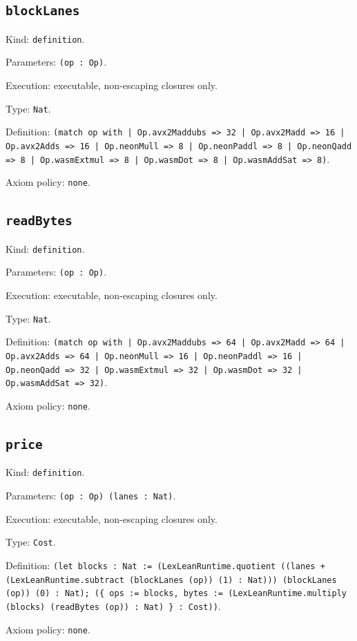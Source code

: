 \documentclass[11pt]{article}
\begin{document}
\subsection*{\texttt{blockLanes}}
\noindent Kind: \texttt{definition}.\par
\noindent Parameters: \texttt{(op : Op)}.\par
\noindent Execution: executable, non-escaping closures only.\par
\noindent Type: \texttt{Nat}.\par
\noindent Definition: \texttt{(match op with | Op.avx2Maddubs => 32 | Op.avx2Madd => 16 | Op.avx2Adds => 16 | Op.neonMull => 8 | Op.neonPaddl => 8 | Op.neonQadd => 8 | Op.wasmExtmul => 8 | Op.wasmDot => 8 | Op.wasmAddSat => 8)}.\par
\noindent Axiom policy: \texttt{none}.\par
\subsection*{\texttt{readBytes}}
\noindent Kind: \texttt{definition}.\par
\noindent Parameters: \texttt{(op : Op)}.\par
\noindent Execution: executable, non-escaping closures only.\par
\noindent Type: \texttt{Nat}.\par
\noindent Definition: \texttt{(match op with | Op.avx2Maddubs => 64 | Op.avx2Madd => 64 | Op.avx2Adds => 64 | Op.neonMull => 16 | Op.neonPaddl => 16 | Op.neonQadd => 32 | Op.wasmExtmul => 32 | Op.wasmDot => 32 | Op.wasmAddSat => 32)}.\par
\noindent Axiom policy: \texttt{none}.\par
\subsection*{\texttt{price}}
\noindent Kind: \texttt{definition}.\par
\noindent Parameters: \texttt{(op : Op) (lanes : Nat)}.\par
\noindent Execution: executable, non-escaping closures only.\par
\noindent Type: \texttt{Cost}.\par
\noindent Definition: \texttt{(let blocks : Nat := (LexLeanRuntime.quotient ((lanes + (LexLeanRuntime.subtract (blockLanes (op)) (1) : Nat))) (blockLanes (op)) (0) : Nat); (\{ ops := blocks, bytes := (LexLeanRuntime.multiply (blocks) (readBytes (op)) : Nat) \} : Cost))}.\par
\noindent Axiom policy: \texttt{none}.\par
\end{document}
